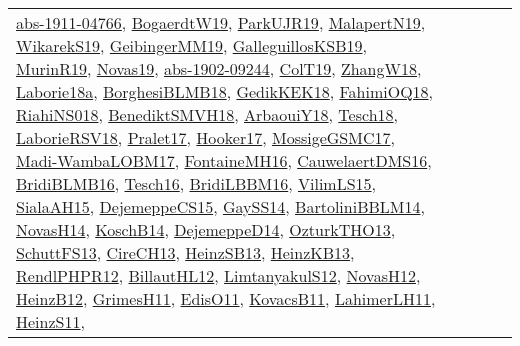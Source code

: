 {\begin{longtable}{lp{3cm}>{\raggedright}p{6cm}>{\raggedright}p{6cm}p{8cm}}
\href{articles/abs-1911-04766.pdf}{abs-1911-04766}\cite{abs-1911-04766}, \href{papers/BogaerdtW19.pdf}{BogaerdtW19}\cite{BogaerdtW19}, \href{papers/ParkUJR19.pdf}{ParkUJR19}\cite{ParkUJR19}, \href{papers/MalapertN19.pdf}{MalapertN19}\cite{MalapertN19}, \href{articles/WikarekS19.pdf}{WikarekS19}\cite{WikarekS19}, \href{papers/GeibingerMM19.pdf}{GeibingerMM19}\cite{GeibingerMM19}, \href{papers/GalleguillosKSB19.pdf}{GalleguillosKSB19}\cite{GalleguillosKSB19}, \href{papers/MurinR19.pdf}{MurinR19}\cite{MurinR19}, \href{articles/Novas19.pdf}{Novas19}\cite{Novas19}, \href{articles/abs-1902-09244.pdf}{abs-1902-09244}\cite{abs-1902-09244}, \href{papers/ColT19.pdf}{ColT19}\cite{ColT19}, \href{articles/ZhangW18.pdf}{ZhangW18}\cite{ZhangW18}, \href{papers/Laborie18a.pdf}{Laborie18a}\cite{Laborie18a}, \href{articles/BorghesiBLMB18.pdf}{BorghesiBLMB18}\cite{BorghesiBLMB18}, \href{articles/GedikKEK18.pdf}{GedikKEK18}\cite{GedikKEK18}, \href{articles/FahimiOQ18.pdf}{FahimiOQ18}\cite{FahimiOQ18}, \href{papers/RiahiNS018.pdf}{RiahiNS018}\cite{RiahiNS018}, \href{papers/BenediktSMVH18.pdf}{BenediktSMVH18}\cite{BenediktSMVH18}, \href{papers/ArbaouiY18.pdf}{ArbaouiY18}\cite{ArbaouiY18}, \href{papers/Tesch18.pdf}{Tesch18}\cite{Tesch18}, \href{articles/LaborieRSV18.pdf}{LaborieRSV18}\cite{LaborieRSV18}, \href{papers/Pralet17.pdf}{Pralet17}\cite{Pralet17}, \href{papers/Hooker17.pdf}{Hooker17}\cite{Hooker17}, \href{papers/MossigeGSMC17.pdf}{MossigeGSMC17}\cite{MossigeGSMC17}, \href{papers/Madi-WambaLOBM17.pdf}{Madi-WambaLOBM17}\cite{Madi-WambaLOBM17}, \href{papers/FontaineMH16.pdf}{FontaineMH16}\cite{FontaineMH16}, \href{papers/CauwelaertDMS16.pdf}{CauwelaertDMS16}\cite{CauwelaertDMS16}, \href{articles/BridiBLMB16.pdf}{BridiBLMB16}\cite{BridiBLMB16}, \href{papers/Tesch16.pdf}{Tesch16}\cite{Tesch16}, \href{papers/BridiLBBM16.pdf}{BridiLBBM16}\cite{BridiLBBM16}, \href{papers/VilimLS15.pdf}{VilimLS15}\cite{VilimLS15}, \href{papers/SialaAH15.pdf}{SialaAH15}\cite{SialaAH15}, \href{papers/DejemeppeCS15.pdf}{DejemeppeCS15}\cite{DejemeppeCS15}, \href{papers/GaySS14.pdf}{GaySS14}\cite{GaySS14}, \href{papers/BartoliniBBLM14.pdf}{BartoliniBBLM14}\cite{BartoliniBBLM14}, \href{articles/NovasH14.pdf}{NovasH14}\cite{NovasH14}, \href{papers/KoschB14.pdf}{KoschB14}\cite{KoschB14}, \href{papers/DejemeppeD14.pdf}{DejemeppeD14}\cite{DejemeppeD14}, \href{articles/OzturkTHO13.pdf}{OzturkTHO13}\cite{OzturkTHO13}, \href{papers/SchuttFS13.pdf}{SchuttFS13}\cite{SchuttFS13}, \href{papers/CireCH13.pdf}{CireCH13}\cite{CireCH13}, \href{articles/HeinzSB13.pdf}{HeinzSB13}\cite{HeinzSB13}, \href{papers/HeinzKB13.pdf}{HeinzKB13}\cite{HeinzKB13}, \href{papers/RendlPHPR12.pdf}{RendlPHPR12}\cite{RendlPHPR12}, \href{papers/BillautHL12.pdf}{BillautHL12}\cite{BillautHL12}, \href{articles/LimtanyakulS12.pdf}{LimtanyakulS12}\cite{LimtanyakulS12}, \href{articles/NovasH12.pdf}{NovasH12}\cite{NovasH12}, \href{papers/HeinzB12.pdf}{HeinzB12}\cite{HeinzB12}, \href{papers/GrimesH11.pdf}{GrimesH11}\cite{GrimesH11}, \href{papers/EdisO11.pdf}{EdisO11}\cite{EdisO11}, \href{articles/KovacsB11.pdf}{KovacsB11}\cite{KovacsB11}, \href{papers/LahimerLH11.pdf}{LahimerLH11}\cite{LahimerLH11}, \href{papers/HeinzS11.pdf}{HeinzS11}\cite{HeinzS11}, 
\end{longtable}}
